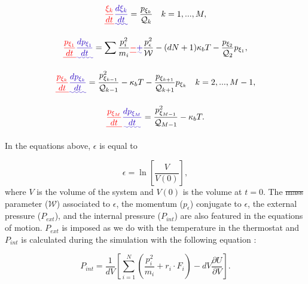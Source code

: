 \documentclass[
	12pt,				%
	openany,			%
	oneside,			%
	a4paper,			%
	english,			%
	brazil				%
	]{abntex2}
\providecommand{\DIFadd}[1]{{\protect\color{blue}\uwave{#1}}}
\providecommand{\DIFdel}[1]{{\protect\color{red}\sout{#1}}}
\providecommand{\DIFaddbegin}{}
\providecommand{\DIFaddend}{}
\providecommand{\DIFdelbegin}{}
\providecommand{\DIFdelend}{}
\providecommand{\DIFadd}[1]{{\protect\color{blue}\uwave{#1}}} %
\providecommand{\DIFdel}[1]{{\protect\color{red}\sout{#1}}}                      %
\providecommand{\DIFaddbegin}{} %
\providecommand{\DIFaddend}{} %
\providecommand{\DIFdelbegin}{} %
\providecommand{\DIFdelend}{} %
\begin{document}
\begin{equation}
\DIFdelbegin \DIFdel{\frac{\xi _{k}}{dt} }\DIFdelend \DIFaddbegin \DIFadd{\frac{d \xi _{k}}{dt} }\DIFaddend = \frac{p_{\xi _k}}{\mathcal{Q} _{k}} \quad k = 1,...,M ,
\end{equation}

\begin{equation}
\DIFdelbegin \DIFdel{\frac{p_{\xi _1}}{dt} }\DIFdelend \DIFaddbegin \DIFadd{\frac{d p_{\xi _1}}{dt} }\DIFaddend = \sum \frac{p_{i}^{2}}{m_{i}} \DIFdelbegin \DIFdel{- }\DIFdelend \DIFaddbegin \DIFadd{+ }\DIFaddend \frac{p_{\epsilon}^{2}}{\mathcal{W}} -  (dN +1)\kappa_{b}T -\frac{p_{\xi _{2}}}{\mathcal{Q} _2}p_{\xi _{1}},
\end{equation}

\begin{equation}
\DIFdelbegin \DIFdel{\frac{p_{\xi _k}}{dt} }\DIFdelend \DIFaddbegin \DIFadd{\frac{d p_{\xi _k}}{dt} }\DIFaddend = \frac{p_{\xi _{k -1}}^{2}}{\mathcal{Q} _{k-1}} - \kappa_{b}T - \frac{p_{\xi _{k+1}}}{\mathcal{Q} _{k+1}}p_{\xi _{k}} \quad k = 2,...,M-1 ,
\end{equation}

\begin{equation}
\DIFdelbegin \DIFdel{\frac{p_{\xi _M}}{dt} }\DIFdelend \DIFaddbegin \DIFadd{\frac{d p_{\xi _M}}{dt} }\DIFaddend = \frac{ p_{\xi _{M-1}}^{2}}{\mathcal{Q} _{M-1}} - \kappa_{b}T .
\end{equation}

In the equations above, $\epsilon$ is equal to

\begin{equation}
\epsilon = \ln \left[\frac{V}{V(0)}\right],
\end{equation}
where $V$ is the volume of the system and $V(0)$ is the volume at $t=0$. The \DIFdelbegin \DIFdel{mass }\DIFdelend parameter ($\mathcal{W}$) associated to $\epsilon$, the momentum ($p_{\epsilon}$) conjugate to $\epsilon$, the external pressure ($P_{ext}$), and the internal pressure ($P_{int}$) are also featured in the equations of motion. $P_{ext}$ is imposed as we do with the temperature in the thermostat and $P_{int}$ is calculated during the simulation with the following equation \cite{tuckerman}:

\begin{equation}
P_{int} = \frac{1}{dV} \left[\sum_{i=1}^{N} \left(\frac{p_{i}^2}{m_i} + r_{i}\cdot F_i \right) - dV \frac{\partial U}{\partial V}\right].
\end{equation}
\end{document}
